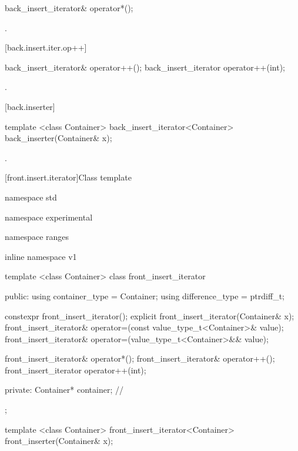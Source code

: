 %
\begin{itemdecl}
back_insert_iterator& operator*();
\end{itemdecl}

\begin{itemdescr}
\pnum
\returns
{}.
\end{itemdescr}

[back.insert.iter.op++]{}

%
\begin{itemdecl}
back_insert_iterator& operator++();
back_insert_iterator operator++(int);
\end{itemdecl}

\begin{itemdescr}
\pnum
\returns
{}.
\end{itemdescr}

[back.inserter]{ }

%
\begin{itemdecl}
template <class Container>
  back_insert_iterator<Container> back_inserter(Container& x);
\end{itemdecl}

\begin{itemdescr}
\pnum
\returns
{}.
\end{itemdescr}

[front.insert.iterator]{Class template }

%
\begin{codeblock}
namespace std { namespace experimental { namespace ranges { inline namespace v1 {
  template <class Container>
  class front_insert_iterator {
  public:
    using container_type = Container;
    using difference_type = ptrdiff_t;

    constexpr front_insert_iterator();
    explicit front_insert_iterator(Container& x);
    front_insert_iterator&
      operator=(const value_type_t<Container>& value);
    front_insert_iterator&
      operator=(value_type_t<Container>&& value);

    front_insert_iterator& operator*();
    front_insert_iterator& operator++();
    front_insert_iterator operator++(int);

  private:
    Container* container; // \expos
  };

  template <class Container>
    front_insert_iterator<Container> front_inserter(Container& x);
}}}}
\end{codeblock}

